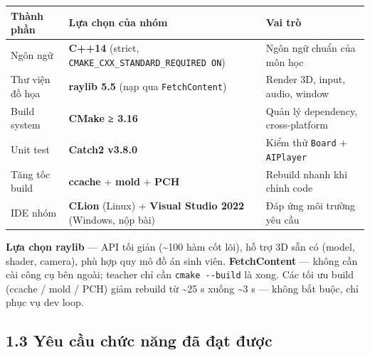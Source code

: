 \documentclass[11pt,a4paper]{article}
\begin{document}
\begin{center}
\begin{tabularx}{\textwidth}{lXX}
Thành phần & Lựa chọn của nhóm & Vai trò\\
\hline
Ngôn ngữ & \textbf{C++14} (strict, \texttt{CMAKE\_CXX\_STANDARD\_REQUIRED ON}) & Ngôn ngữ chuẩn của môn học\\
Thư viện đồ họa & \textbf{raylib 5.5} (nạp qua \texttt{FetchContent}) & Render 3D, input, audio, window\\
Build system & \textbf{CMake ≥ 3.16} & Quản lý dependency, cross-platform\\
Unit test & \textbf{Catch2 v3.8.0} & Kiểm thử \texttt{Board} + \texttt{AIPlayer}\\
Tăng tốc build & \textbf{ccache} + \textbf{mold} + \textbf{PCH} & Rebuild nhanh khi chỉnh code\\
IDE nhóm & \textbf{CLion} (Linux) + \textbf{Visual Studio 2022} (Windows, nộp bài) & Đáp ứng môi trường yêu cầu\\
\end{tabularx}
\end{center}

\textbf{Lựa chọn raylib} — API tối giản (\textasciitilde{}100 hàm cốt lõi), hỗ trợ 3D sẵn có (model, shader, camera), phù hợp quy mô đồ án sinh viên. \textbf{FetchContent} — không cần cài công cụ bên ngoài; teacher chỉ cần \texttt{cmake -{}-{}build} là xong. Các tối ưu build (ccache / mold / PCH) giảm rebuild từ \textasciitilde{}25 s xuống \textasciitilde{}3 s — không bắt buộc, chỉ phục vụ dev loop.
\subsection{1.3 Yêu cầu chức năng đã đạt được}
\label{sec:org36a1021}
\end{document}
